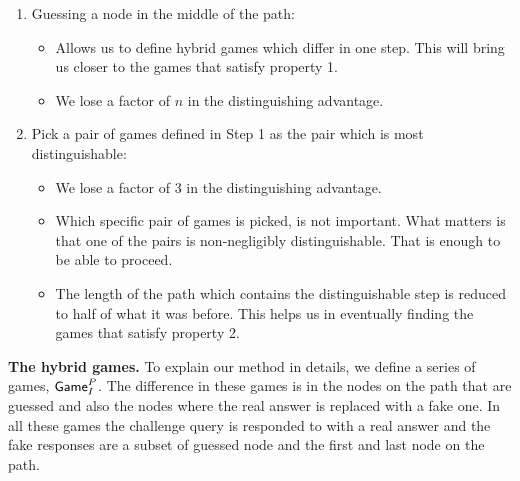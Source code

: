 \documentclass{article}
\newcommand{\game}{{\sf Game}}
\newcommand{\dgg}[2]{\game_{#1}^{#2}}
\begin{document}
\begin{enumerate}[Step 1.]
\item Guessing a node in the middle of the path: \begin{itemize} \item Allows us to define hybrid games which differ in one step.  This will bring us closer to the games that satisfy property 1. \item We lose a factor of $n$ in the distinguishing advantage. \end{itemize}
\item Pick a pair of games defined in Step 1 as the pair which is most distinguishable: \begin{itemize} \item We lose a factor of 3 in the distinguishing advantage. \item  Which specific pair of games is picked, is not important. What matters is that one of the pairs is non-negligibly distinguishable. That is enough to be able to proceed. \item The length of the path which contains the distinguishable step is reduced to half of what it was before. This helps us in eventually finding the games that satisfy property 2.
\end{itemize}
\end{enumerate}
\fi
\textbf{The hybrid games.} To explain our method in details, we define a series of games, $\dgg{I}{P}$. The difference in these games is in the nodes on the path that are guessed and also the nodes where the real answer is replaced with a fake one. In all these games the challenge query is responded to with a real answer and the fake responses are a subset of guessed node and the first and last node on the path. 
\end{document}
